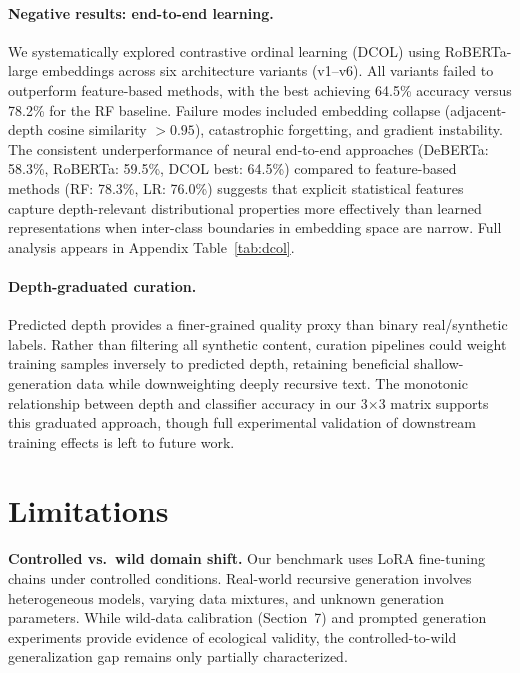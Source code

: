 \documentclass[11pt,a4paper]{article}
\begin{document}
\paragraph{Negative results: end-to-end learning.}
We systematically explored contrastive ordinal learning (DCOL) using RoBERTa-large embeddings across six architecture variants (v1--v6). All variants failed to outperform feature-based methods, with the best achieving 64.5\% accuracy versus 78.2\% for the RF baseline. Failure modes included embedding collapse (adjacent-depth cosine similarity $> 0.95$), catastrophic forgetting, and gradient instability. The consistent underperformance of neural end-to-end approaches (DeBERTa: 58.3\%, RoBERTa: 59.5\%, DCOL best: 64.5\%) compared to feature-based methods (RF: 78.3\%, LR: 76.0\%) suggests that explicit statistical features capture depth-relevant distributional properties more effectively than learned representations when inter-class boundaries in embedding space are narrow. Full analysis appears in Appendix Table~\ref{tab:dcol}.

\paragraph{Depth-graduated curation.}
Predicted depth provides a finer-grained quality proxy than binary real/synthetic labels. Rather than filtering all synthetic content, curation pipelines could weight training samples inversely to predicted depth, retaining beneficial shallow-generation data while downweighting deeply recursive text. The monotonic relationship between depth and classifier accuracy in our 3$\times$3 matrix supports this graduated approach, though full experimental validation of downstream training effects is left to future work.

\section{Limitations}

\textbf{Controlled vs.\ wild domain shift.} Our benchmark uses LoRA fine-tuning chains under controlled conditions. Real-world recursive generation involves heterogeneous models, varying data mixtures, and unknown generation parameters. While wild-data calibration (Section~7) and prompted generation experiments provide evidence of ecological validity, the controlled-to-wild generalization gap remains only partially characterized.
\end{document}
